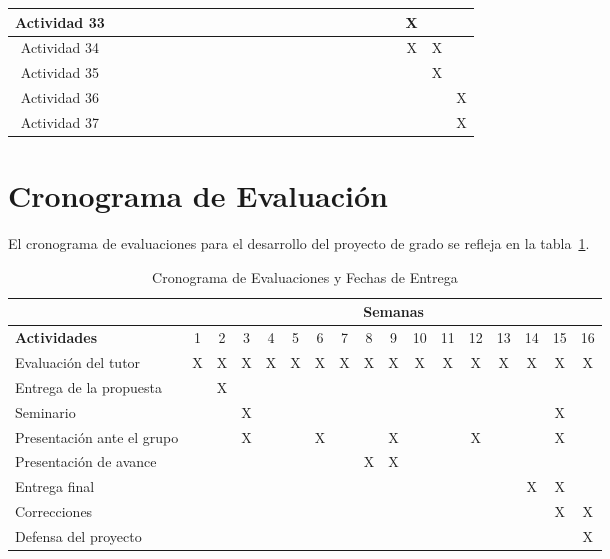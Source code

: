 \begin{center}
\begin{longtable}[c]{|c|c|c|c|c|c|c|c|c|c|c|c|c|c|c|c|c|}
    Actividad 33            & ~ & ~ & ~ & ~ & ~ & ~ & ~ & ~ & ~ & ~  & ~  & ~  & ~  & X  & ~  & ~  \\ \hline
    Actividad 34            & ~ & ~ & ~ & ~ & ~ & ~ & ~ & ~ & ~ & ~  & ~  & ~  & ~  & X  & X  & ~  \\ \hline
    Actividad 35            & ~ & ~ & ~ & ~ & ~ & ~ & ~ & ~ & ~ & ~  & ~  & ~  & ~  & ~  & X  & ~  \\ \hline
    Actividad 36            & ~ & ~ & ~ & ~ & ~ & ~ & ~ & ~ & ~ & ~  & ~  & ~  & ~  & ~  & ~  & X  \\ \hline
    Actividad 37            & ~ & ~ & ~ & ~ & ~ & ~ & ~ & ~ & ~ & ~  & ~  & ~  & ~  & ~  & ~  & X \\ \hline
\end{longtable}
\end{center}

\section*{Cronograma de Evaluación}

El cronograma de evaluaciones para el desarrollo del proyecto de grado se refleja en la tabla~\ref{tab:cronogramaevaluaciones}.

\begin{table}[!ht]
	\scriptsize
	\caption{Cronograma de Evaluaciones y Fechas de Entrega}
    \begin{tabular}{|l|c|c|c|c|c|c|c|c|c|c|c|c|c|c|c|c|}
    \hline
    ~                               & \multicolumn{16}{c|}{\textbf{Semanas}} \\ \hline
    \textbf{Actividades}            & 1 & 2 & 3 & 4 & 5 & 6 & 7 & 8 & 9 & 10 & 11 & 12 & 13 & 14 & 15 & 16 \\ \hline
    Evaluación del tutor            & X & X & X & X & X & X & X & X & X & X  & X  & X  & X  & X  & X  & X  \\ \hline
    Entrega de la propuesta         & ~ & X & ~ & ~ & ~ & ~ & ~ & ~ & ~ & ~  & ~  & ~  & ~  & ~  & ~  & ~  \\ \hline
    Seminario                       & ~ & ~ & X & ~ & ~ & ~ & ~ & ~ & ~ & ~  & ~  & ~  & ~  & ~  & X  & ~  \\ \hline
    Presentación ante el grupo      & ~ & ~ & X & ~ & ~ & X & ~ & ~ & X & ~  & ~  & X  & ~  & ~  & X  & ~  \\ \hline
    Presentación de avance          & ~ & ~ & ~ & ~ & ~ & ~ & ~ & X & X & ~  & ~  & ~  & ~  & ~  & ~  & ~  \\ \hline
    Entrega final                   & ~ & ~ & ~ & ~ & ~ & ~ & ~ & ~ & ~ & ~  & ~  & ~  & ~  & X  & X  & ~  \\ \hline
    Correcciones                    & ~ & ~ & ~ & ~ & ~ & ~ & ~ & ~ & ~ & ~  & ~  & ~  & ~  & ~  & X  & X  \\ \hline
    Defensa del proyecto            & ~ & ~ & ~ & ~ & ~ & ~ & ~ & ~ & ~ & ~  & ~  & ~  & ~  & ~  & ~  & X  \\ \hline
    \end{tabular}
	\label{tab:cronogramaevaluaciones}
\end{table}